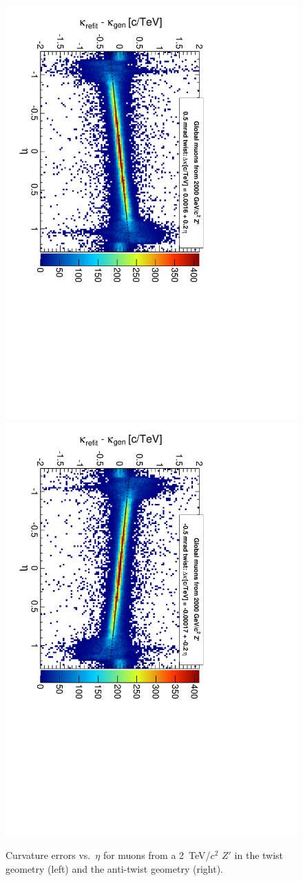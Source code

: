 \documentclass[12pt]{article}
\begin{document}
\begin{figure}
\includegraphics[height=0.5\linewidth, angle=90]{curvbias_vseta_twist0_5mrad_2000_GlobalMuons2.pdf}
\includegraphics[height=0.5\linewidth, angle=90]{curvbias_vseta_antitwist0_5mrad_2000_GlobalMuons2.pdf}

\caption{Curvature errors vs.\ $\eta$ for muons from a 2~TeV/$c^2$
  $Z'$ in the twist geometry (left) and the anti-twist geometry
  (right). \label{fig:curvbias_vseta_twist0_5mrad_2000_GlobalMuons2}}
\end{figure}
\end{document}

